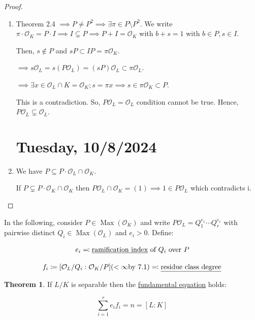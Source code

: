 \documentclass[openany]{amsbook}
\numberwithin{section}{chapter}
\theoremstyle{definition}
\newtheorem{theorem}{Theorem}[chapter]
\begin{document}
\begin{proof}
    \begin{enumerate}[label=\roman*)]
        \item Theorem 2.4 \(\implies P \neq P^2 \implies \exists \pi \in P \setminus P^2\). We write \(\pi \cdot \mathcal{O}_K = P \cdot I \implies I \subsetneq P \implies P + I = \mathcal{O}_K\) with \(b+s = 1\) with \(b \in P, s \in I\).
        
        Then, \(s\notin P\) and \(sP \subset IP = \pi \mathcal{O}_K\). 
        
        \(\implies s \mathcal{O}_L = s (P \mathcal{O}_L) = (sP)\mathcal{O}_L \subset \pi\mathcal{O}_L\).

        \(\implies \exists x\in \mathcal{O}_L \cap K = \mathcal{O}_K; s = \pi x \implies s \in \pi \mathcal{O}_K \subset P\). 

        This is a contradiction. So, \(P \mathcal{O}_L = \mathcal{O}_L\) condition cannot be true. Hence, \(P\mathcal{O}_L \subsetneq \mathcal{O}_L\).
\section*{Tuesday, 10/8/2024}

        \item We have \(P \subseteq P\cdot \mathcal{O}_L \cap \mathcal{O}_K\).
        
        If \(P \subsetneq P\cdot \mathcal{O}_K \cap \mathcal{O}_K\) then \(P\mathcal{O}_L \cap \mathcal{O}_K = (1) \implies 1\in P \mathcal{O}_L\) which contradicts i.

    \end{enumerate}

\end{proof}

In the following, consider \(P\in \operatorname{Max} (\mathcal{O}_K)\) and write \(P\mathcal{O}_L = Q_1^{e_1}\cdots Q_r^{e_r}\) with pairwise distinct \(Q_i\in \operatorname{Max}(\mathcal{O}_L)\) and \(e_i > 0\). Define:

\[
    e_i \eqqcolon \text{\underline{ramification index} of \(Q_i\) over \(P\)} 
\]

\[
    f_i \coloneqq [\mathcal{O}_L / Q_i : \mathcal{O}_K / P] (< \infty \text{by 7.1}) \eqqcolon \text{\underline{residue class degree}}
\]

\begin{theorem}
    If \(L / K\) is separable then the \underline{fundamental equation} holds:

    \[
        \sum_{i=1}^r e_i f_i = n = [L:K]
    \]
\end{theorem}
\end{document}
